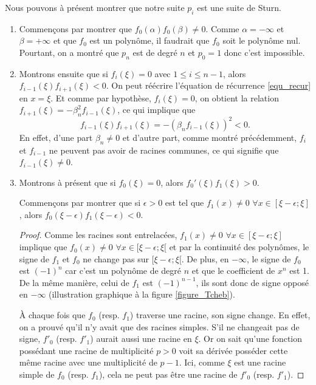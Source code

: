 	Nous pouvons à présent montrer que notre suite $p_i$ est une suite de Sturn.
\begin{enumerate}
  \item Commençons par montrer que $f_0(\alpha)f_0(\beta) \neq 0$.
    Comme $\alpha = -\infty$ et $\beta = + \infty$ et que $f_0$ est un polynôme,
    il faudrait que $f_0$ soit le polynôme nul.
    Pourtant, on a montré que $p_n$ est de degré $n$ et $p_0 = 1$ donc
    c'est impossible.
  \item Montrons ensuite que si $f_i(\xi) = 0$ avec $1 \leq i \leq n-1$,
    alors $f_{i-1}(\xi)f_{i+1}(\xi) < 0$.
    On peut réécrire l'équation de récurrence \ref{equ_recur} en $x=\xi$.
    Et comme par hypothèse, $f_i(\xi)=0$, on obtient la relation
    $f_{i+1}(\xi) = -\beta_n^2f_{i-1}(\xi)$, ce qui implique que
    \[ f_{i-1}(\xi)f_{i+1}(\xi) = -(\beta_nf_{i-1}(\xi))^2 < 0. \]
    En effet, d'une part $\beta_n \neq 0$ et d'autre part, comme montré précédemment, $f_i$ et $f_{i-1}$ ne peuvent
    pas avoir de racines communes, ce qui signifie que $f_{i-1}(\xi) \neq 0$.
  \item Montrons à présent que si $f_0(\xi) = 0$,
    alors $f_0'(\xi)f_1(\xi) > 0$.

    Commençons par montrer que si $\epsilon > 0$ est tel que
    $f_1(x) \neq 0$ $\forall x \in [\xi - \epsilon; \xi]$, alors
    $f_0(\xi-\epsilon) f_1(\xi-\epsilon) < 0$.

    \begin{proof}
      Comme les racines sont entrelacées,
      $f_1(x) \neq 0$ $\forall x \in [\xi - \epsilon; \xi]$ implique que
      $f_0(x) \neq 0$ $\forall x \in [\xi - \epsilon; \xi[$
      et par la continuité des polynômes, le signe de $f_1$ et $f_0$ ne change pas
      sur $[\xi - \epsilon; \xi[$.
      De plus, en $-\infty$,
      le signe de $f_0$ est $(-1)^n$ car c'est un polynôme de
      degré $n$ et que le coefficient de $x^n$ est 1.
      De la même manière, celui de $f_1$ est $(-1)^{n-1}$,
      ils sont donc de signe opposé en $-\infty$ (illustration graphique à la figure \ref{figure_Tcheb}).


      À chaque fois que $f_0$ (resp. $f_1$) traverse une racine, son signe change.
      En effet, on a prouvé qu'il n'y avait que des racines simples.
      S'il ne changeait pas de signe, $f'_0$ (resp. $f'_1$) aurait
      aussi une racine en $\xi$.
      Or on sait qu'une fonction possédant une racine de multiplicité $p > 0$
      voit sa dérivée posséder cette même racine avec une multiplicité de $p-1$.
      Ici, comme $\xi$ est une racine simple de $f_0$ (resp. $f_1$),
      cela ne peut pas être une racine de $f'_0$ (resp. $f'_1$).


\end{proof}
\end{enumerate}
